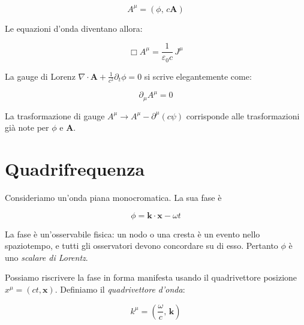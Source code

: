 \begin{tcolorbox}[colback=yellow!10!white, colframe=orange!70!black, boxrule=0.8pt]
\begin{equation}\label{eq: quadripotenziale}
    A^\mu = (\phi,\, c\mathbf{A})
\end{equation}
\end{tcolorbox}

Le equazioni d'onda diventano allora:

\begin{tcolorbox}[colback=yellow!10!white, colframe=orange!70!black, boxrule=0.8pt]
\begin{equation}\label{eq: onda_covariante}
    \Box A^\mu = \frac{1}{\varepsilon_0 c}\,J^\mu
\end{equation}
\end{tcolorbox}

La gauge di Lorenz $\nabla\cdot\mathbf{A} + \frac{1}{c^2}\partial_t \phi = 0$ si scrive elegantemente come:

\begin{tcolorbox}[colback=yellow!10!white, colframe=orange!70!black, boxrule=0.8pt]
\begin{equation} \label{eq: gauge_Lorentz_covariante}
    \partial_\mu A^\mu = 0
\end{equation}
\end{tcolorbox}

La trasformazione di gauge $A^\mu \to A^\mu - \partial^\mu(c\psi)$ corrisponde alle trasformazioni già note per $\phi$ e $\mathbf{A}$.

\section{Quadrifrequenza}

Consideriamo un'onda piana monocromatica. La sua fase è 

\begin{equation}
    \phi = \mathbf{k} \cdot \mathbf{x} - \omega t
\end{equation}

La fase è un'osservabile fisica: un nodo o una cresta è un evento nello spaziotempo, e tutti gli osservatori devono concordare su di esso. Pertanto $\phi$ è uno \emph{scalare di Lorentz}. 

Possiamo riscrivere la fase in forma manifesta usando il quadrivettore posizione $x^{\mu} = (ct, \mathbf{x})$. 
Definiamo il \emph{quadrivettore d'onda}:

\begin{tcolorbox}[colback=yellow!10!white, colframe=orange!70!black, boxrule=0.8pt]
\begin{equation}
    k^{\mu} = \left(\frac{\omega}{c},\, \mathbf{k}\right)
\end{equation}
\end{tcolorbox}

